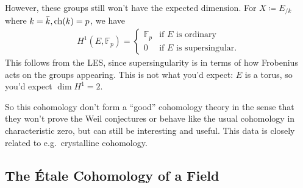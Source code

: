 \begin{example}[?]

However, these groups still won't have the expected dimension. For
\(X \coloneqq E_{/k}\) where
\(k=\mkern 1.5mu\overline{\mkern-1.5muk\mkern-1.5mu}\mkern 1.5mu, \operatorname{ch}(k) = p\),
we have
\begin{align*}  
H^1(E, {\mathbb{F}}_p) = 
\begin{cases}
{\mathbb{F}}_p & \text{if $E$ is ordinary} \\
0 & \text{if $E$ is supersingular}.
\end{cases}
\end{align*}
This follows from the LES, since supersingularity is in terms of how
Frobenius acts on the groups appearing. This is not what you'd expect:
\(E\) is a torus, so you'd expect \(\dim H^1 = 2\).

\end{example}

\begin{remark}

So this cohomology don't form a ``good'' cohomology theory in the sense
that they won't prove the Weil conjectures or behave like the usual
cohomology in characteristic zero, but can still be interesting and
useful. This data is closely related to e.g.~crystalline cohomology.

\end{remark}

\hypertarget{the-uxe9tale-cohomology-of-a-field}{%
\subsection{The Étale Cohomology of a
Field}\label{the-uxe9tale-cohomology-of-a-field}}

